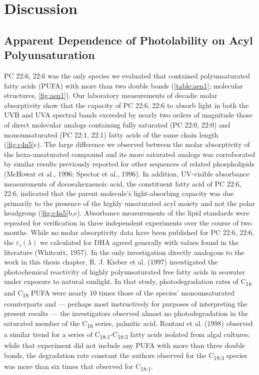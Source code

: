 \section{Discussion}
\subsection{Apparent Dependence of Photolability on Acyl Polyunsaturation}
\label{ssec:Apparent Dependence of Photolability on Acyl Polyunsaturation}

PC 22:6, 22:6 was the only species we evaluated that contained polyunsaturated fatty acids (PUFA) with more than two double bonds (\autoref{table:aen1}; molecular structures, \autoref{fig:aen1}). Our laboratory measurements of decadic molar absorptivity show that the capacity of PC 22:6, 22:6 to absorb light in both the UVB and UVA spectral bands exceeded by nearly two orders of magnitude those of direct molecular analogs containing fully saturated (PC 22:0, 22:0) and monounsaturated (PC 22:1, 22:1) fatty acids of the same chain length (\autoref{fig:c4n5}c). The large difference we observed between the molar absorptivity of the hexa-unsaturated compound and its more saturated analogs was corroborated by similar results previously reported for other sequences of related phospholipids (McHowat et al., 1996; Spector et al., 1996). In addition, UV-visible absorbance measurements of docosahexaenoic acid, the constituent fatty acid of PC 22:6, 22:6, indicated that the parent molecule's light-absorbing capacity was due primarily to the presence of the highly unsaturated acyl moiety and not the polar headgroup (\autoref{fig:c4n5}b,c). Absorbance measurements of the lipid standards were repeated for verification in three independent experiments over the course of two months. While no molar absorptivity data have been published for PC 22:6, 22:6, the ${\varepsilon _i}(\lambda )$ we calculated for DHA agreed generally with values found in the literature (Whitcutt, 1957). In the only investigation directly analogous to the work in this thesis chapter, R. J. Kieber et al. (1997) investigated the photochemical reactivity of highly polyunsaturated free fatty acids in seawater under exposure to natural sunlight. In that study, photodegradation rates of C\textsubscript{16} and C\textsubscript{18} PUFA were nearly 10 times those of the species' monounsaturated counterparts and --- perhaps most instructively for purposes of interpreting the present results --- the investigators observed almost no photodegradation in the saturated member of the C\textsubscript{16} series, palmitic acid. Rontani et al. (1998) observed a similar trend for a series of C\textsubscript{18:1}-C\textsubscript{18:3} fatty acids isolated from algal cultures; while that experiment did not include any PUFA with more than three double bonds, the degradation rate constant the authors observed for the C\textsubscript{18:3} species was more than six times that observed for C\textsubscript{18:1}.

